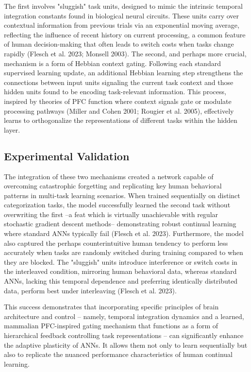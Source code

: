 \documentclass[
10pt, %
a4paper, %
oneside, %
headinclude,footinclude, %
BCOR5mm, %
]{scrartcl}
\begin{document}
{The first involves "sluggish" task units, designed to mimic the intrinsic temporal integration constants found in biological neural circuits. These units carry over contextual information from previous trials via an exponential moving average, reflecting the influence of recent history on current processing, a common feature of human decision-making that often leads to switch costs when tasks change rapidly }(Flesch et al. 2023; Monsell 2003){. The second, and perhaps more crucial, mechanism is a form of Hebbian context gating. Following each standard supervised learning update, an additional Hebbian learning step strengthens the connections between input units signaling the current task context and those hidden units found to be encoding task-relevant information. This process, inspired by theories of PFC function where context signals gate or modulate processing pathways }(Miller and Cohen 2001; Rougier et al. 2005){, effectively learns to orthogonalize the representations of different tasks within the hidden layer.}

\subsection{Experimental Validation}

The integration of these two mechanisms created a network capable of overcoming catastrophic forgetting and replicating key human behavioral patterns in multi-task learning scenarios. When trained sequentially on distinct categorization tasks, the model successfully learned the second task without overwriting the first –a feat which is virtually unachievable with regular stochastic gradient descent methods– demonstrating robust continual learning where standard ANNs typically fail (Flesch et al. 2023). {Furthermore, the model also captured the perhaps counterintuitive human tendency to perform less accurately when tasks are randomly switched during training compared to when they are blocked. The "sluggish" units introduce interference or switch costs in the interleaved condition, mirroring human behavioral data, whereas standard ANNs, lacking this temporal dependence and preferring identically distributed data, perform best under interleaving (Flesch et al. 2023).}

This success demonstrates that incorporating specific principles of brain architecture and control – namely, temporal integration dynamics and a learned, mammalian PFC-inspired gating mechanism that functions as a form of hierarchical feedback controlling task representations – can significantly enhance the adaptive plasticity of ANNs. It allows them not only to learn sequentially but also to replicate the nuanced performance characteristics of human continual learning.
\end{document}
